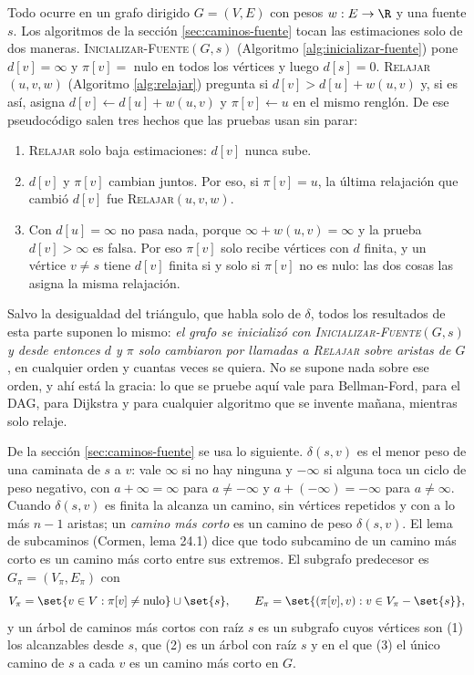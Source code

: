 \documentclass[11pt,letterpaper]{article}
\begin{document}
Todo ocurre en un grafo dirigido $G = (V, E)$ con pesos
$w : E \to \R$ y una fuente $s$. Los algoritmos de la sección
\ref{sec:caminos-fuente} tocan las estimaciones solo de dos maneras.
\textsc{Inicializar-Fuente}$(G, s)$ (Algoritmo
\ref{alg:inicializar-fuente}) pone $d[v] = \infty$ y $\pi[v] =$ nulo
en todos los vértices y luego $d[s] = 0$.
\textsc{Relajar}$(u, v, w)$ (Algoritmo \ref{alg:relajar}) pregunta si
$d[v] > d[u] + w(u, v)$ y, si es así, asigna
$d[v] \gets d[u] + w(u, v)$ y $\pi[v] \gets u$ en el mismo renglón. De
ese pseudocódigo salen tres hechos que las pruebas usan sin parar:
\begin{enumerate}[label=(\roman*)]
  \item \textsc{Relajar} solo baja estimaciones: $d[v]$ nunca sube.
  \item $d[v]$ y $\pi[v]$ cambian juntos. Por eso, si $\pi[v] = u$, la
    última relajación que cambió $d[v]$ fue
    \textsc{Relajar}$(u, v, w)$.
  \item Con $d[u] = \infty$ no pasa nada, porque
    $\infty + w(u, v) = \infty$ y la prueba $d[v] > \infty$ es falsa.
    Por eso $\pi[v]$ solo recibe vértices con $d$ finita, y un vértice
    $v \ne s$ tiene $d[v]$ finita si y solo si $\pi[v]$ no es nulo:
    las dos cosas las asigna la misma relajación.
\end{enumerate}

Salvo la desigualdad del triángulo, que habla solo de $\delta$, todos
los resultados de esta parte suponen lo mismo: \emph{el grafo se
inicializó con \textsc{Inicializar-Fuente}$(G, s)$ y desde entonces
$d$ y $\pi$ solo cambiaron por llamadas a \textsc{Relajar} sobre
aristas de $G$}, en cualquier orden y cuantas veces se quiera. No se
supone nada sobre ese orden, y ahí está la gracia: lo que se pruebe
aquí vale para Bellman-Ford, para el DAG, para Dijkstra y para
cualquier algoritmo que se invente mañana, mientras solo relaje.

De la sección \ref{sec:caminos-fuente} se usa lo siguiente.
$\delta(s, v)$ es el menor peso de una caminata de $s$ a $v$: vale
$\infty$ si no hay ninguna y $-\infty$ si alguna toca un ciclo de peso
negativo, con $a + \infty = \infty$ para $a \ne -\infty$ y
$a + (-\infty) = -\infty$ para $a \ne \infty$. Cuando $\delta(s, v)$ es
finita la alcanza un camino, sin vértices repetidos y con a lo más
$n - 1$ aristas; un \emph{camino más corto} es un camino de peso
$\delta(s, v)$. El lema de subcaminos (Cormen, lema 24.1) dice que todo
subcamino de un camino más corto es un camino más corto entre sus
extremos. El subgrafo predecesor es $G_\pi = (V_\pi, E_\pi)$ con
\[
  V_\pi = \set{v \in V : \pi[v] \ne \text{nulo}} \cup \set{s},
  \qquad
  E_\pi = \set{(\pi[v], v) : v \in V_\pi - \set{s}} ,
\]
y un árbol de caminos más cortos con raíz $s$ es un subgrafo cuyos
vértices son (1) los alcanzables desde $s$, que (2) es un árbol con
raíz $s$ y en el que (3) el único camino de $s$ a cada $v$ es un
camino más corto en $G$.
\end{document}
